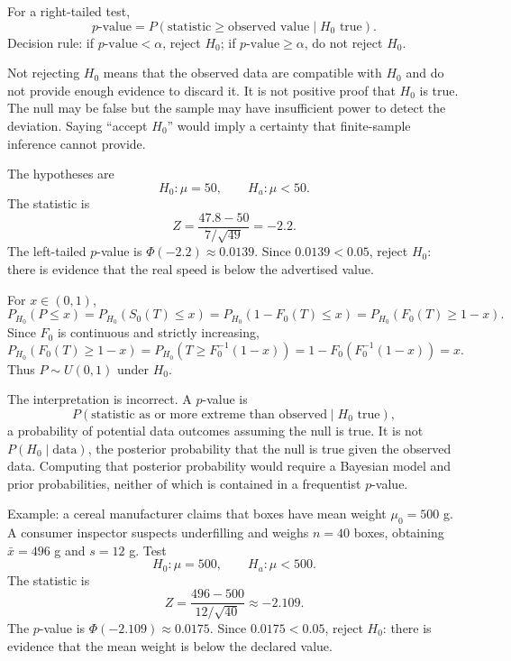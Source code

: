 \begin{solproblema}[prob:f1273a2]
For a right-tailed test,
\[
	p\text{-value}=P(\text{statistic}\ge\text{observed value}\mid H_0\text{ true}).
\]
Decision rule: if $p\text{-value}<\alpha$, reject $H_0$; if $p\text{-value}\ge\alpha$, do not reject $H_0$.
\end{solproblema}

\begin{solproblema}[prob:ed08255]
Not rejecting $H_0$ means that the observed data are compatible with $H_0$ and do not provide enough evidence to discard it. It is not positive proof that $H_0$ is true. The null may be false but the sample may have insufficient power to detect the deviation. Saying ``accept $H_0$'' would imply a certainty that finite-sample inference cannot provide.
\end{solproblema}

\begin{solproblema}[prob:28d9ae6]
The hypotheses are
\[
	H_0:\mu=50,\qquad H_a:\mu<50.
\]
The statistic is
\[
	Z=\frac{47.8-50}{7/\sqrt{49}}=-2.2.
\]
The left-tailed $p$-value is $\Phi(-2.2)\approx0.0139$. Since $0.0139<0.05$, reject $H_0$: there is evidence that the real speed is below the advertised value.
\end{solproblema}

\begin{solproblema}
For $x\in(0,1)$,
\[
	P_{H_0}(P\le x)
	=P_{H_0}(S_0(T)\le x)
	=P_{H_0}(1-F_0(T)\le x)
	=P_{H_0}(F_0(T)\ge1-x).
\]
Since $F_0$ is continuous and strictly increasing,
\[
	P_{H_0}(F_0(T)\ge1-x)
	=P_{H_0}(T\ge F_0^{-1}(1-x))
	=1-F_0(F_0^{-1}(1-x))=x.
\]
Thus $P\sim U(0,1)$ under $H_0$.
\end{solproblema}

\begin{solproblema}[prob:af3b6da]
The interpretation is incorrect. A $p$-value is
\[
	P(\text{statistic as or more extreme than observed}\mid H_0\text{ true}),
\]
a probability of potential data outcomes assuming the null is true. It is not $P(H_0\mid\text{data})$, the posterior probability that the null is true given the observed data. Computing that posterior probability would require a Bayesian model and prior probabilities, neither of which is contained in a frequentist $p$-value.
\end{solproblema}

\begin{solproblema}[prob:de31e8f]
Example: a cereal manufacturer claims that boxes have mean weight $\mu_0=500$ g. A consumer inspector suspects underfilling and weighs $n=40$ boxes, obtaining $\bar x=496$ g and $s=12$ g. Test
\[
	H_0:\mu=500,\qquad H_a:\mu<500.
\]
The statistic is
\[
	Z=\frac{496-500}{12/\sqrt{40}}\approx-2.109.
\]
The $p$-value is $\Phi(-2.109)\approx0.0175$. Since $0.0175<0.05$, reject $H_0$: there is evidence that the mean weight is below the declared value.
\end{solproblema}
